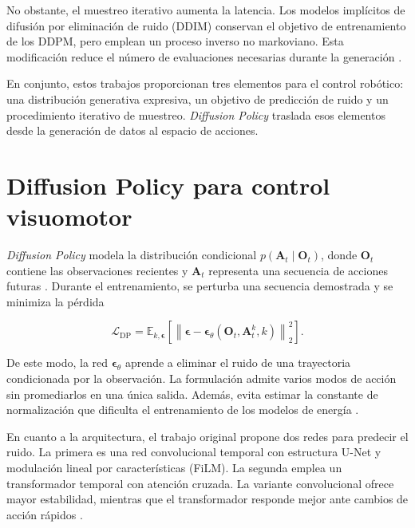 No obstante, el muestreo iterativo aumenta la latencia. Los modelos impl\'icitos de
difusi\'on por eliminaci\'on de ruido (DDIM) conservan el objetivo de entrenamiento de
los DDPM, pero emplean un proceso inverso no markoviano. Esta modificaci\'on reduce el
n\'umero de evaluaciones necesarias durante la generaci\'on \cite{song2021ddim}.

En conjunto, estos trabajos proporcionan tres elementos para el control rob\'otico:
una distribuci\'on generativa expresiva, un objetivo de predicci\'on de ruido y un
procedimiento iterativo de muestreo. \textit{Diffusion Policy} traslada esos
elementos desde la generaci\'on de datos al espacio de acciones.

\section{Diffusion Policy para control visuomotor}
\label{sec:diffusion-policy}

\textit{Diffusion Policy} modela la distribuci\'on condicional
$p(\mathbf{A}_{t}\mid\mathbf{O}_{t})$, donde $\mathbf{O}_{t}$ contiene las
observaciones recientes y $\mathbf{A}_{t}$ representa una secuencia de acciones
futuras \cite{chi2025diffusion}. Durante el entrenamiento, se perturba una secuencia
demostrada y se minimiza la p\'erdida

\begin{equation}
  \mathcal{L}_{\mathrm{DP}} =
  \mathbb{E}_{k,\boldsymbol{\epsilon}}
  \left[\left\lVert
  \boldsymbol{\epsilon} -
  \boldsymbol{\epsilon}_{\theta}
  (\mathbf{O}_{t},\mathbf{A}_{t}^{k},k)
  \right\rVert_{2}^{2}\right].
  \label{eq:perdida-diffusion-policy}
\end{equation}

De este modo, la red $\boldsymbol{\epsilon}_{\theta}$ aprende a eliminar el ruido de
una trayectoria condicionada por la observaci\'on. La formulaci\'on admite varios
modos de acci\'on sin promediarlos en una \'unica salida. Adem\'as, evita estimar la
constante de normalizaci\'on que dificulta el entrenamiento de los modelos de energ\'ia
\cite{chi2025diffusion}.

En cuanto a la arquitectura, el trabajo original propone dos redes para predecir el
ruido. La primera es una red convolucional temporal con estructura U-Net y
modulaci\'on lineal por caracter\'isticas (FiLM). La segunda emplea un transformador
temporal con atenci\'on cruzada. La variante convolucional ofrece mayor estabilidad,
mientras que el transformador responde mejor ante cambios de acci\'on r\'apidos
\cite{chi2025diffusion}.

